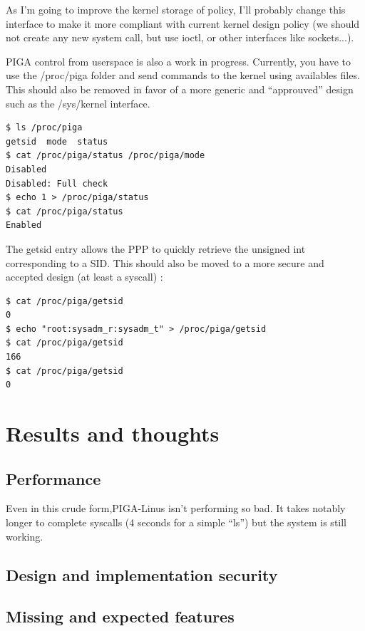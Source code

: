 \documentclass[pdftex,a4paper,titlepage,11pt]{article}
\begin{document}
As I'm going to improve the kernel storage of policy, I'll probably change this interface to make it more compliant with current kernel design policy (we should not create any new system call, but use ioctl, or other interfaces like sockets...).

PIGA control from userspace is also a work in progress. Currently, you have to use the /proc/piga folder and send commands to the kernel using availables files. This should also be removed in favor of a more generic and ``approuved'' design such as the /sys/kernel interface.

\begin{lstlisting}
$ ls /proc/piga
getsid  mode  status
$ cat /proc/piga/status /proc/piga/mode
Disabled
Disabled: Full check
$ echo 1 > /proc/piga/status
$ cat /proc/piga/status
Enabled
\end{lstlisting}

The getsid entry allows the PPP to quickly retrieve the unsigned int corresponding to a SID. This should also be moved to a more secure and accepted design (at least a syscall) :

\begin{lstlisting}
$ cat /proc/piga/getsid
0
$ echo "root:sysadm_r:sysadm_t" > /proc/piga/getsid
$ cat /proc/piga/getsid
166
$ cat /proc/piga/getsid
0
\end{lstlisting}

\newpage

\section{Results and thoughts}

\subsection{Performance}

Even in this crude form,PIGA-Linus isn't performing so bad. It takes notably longer to complete syscalls (4 seconds for a simple ``ls'') but the system is still working.


\subsection{Design and implementation security}

\subsection{Missing and expected features}
\end{document}
